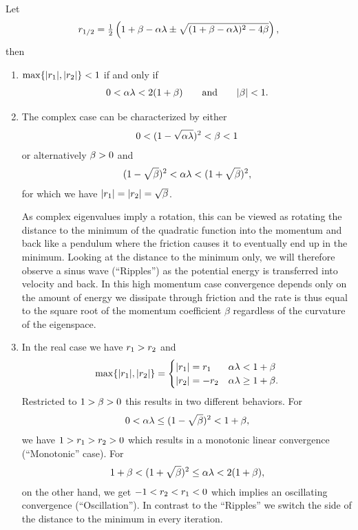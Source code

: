 \begin{theorem}
	\label{thm: momentum - stable set of parameters}
	Let
	\begin{align*}
		r_{1/2}
		= \tfrac12 \left(
			1+\beta-\alpha\lambda \pm \sqrt{(1+\beta-\alpha\lambda)^2 - 4\beta}
		\right),
	\end{align*}
	then 
	\begin{enumerate}
		\item \(\max\{|r_1|,|r_2|\}<1\) if and only if
		\begin{align*}
			0<\alpha\lambda < 2(1+\beta) \qquad \text{and} \qquad |\beta|<1.
		\end{align*}
		\item The complex case can be characterized by either
		\begin{align*}
			0<(1-\sqrt{\alpha\lambda})^2 < \beta < 1
		\end{align*}		
		or alternatively \(\beta>0\) and
		\begin{align*}
			(1-\sqrt{\beta})^2 < \alpha\lambda < (1+\sqrt{\beta})^2,
		\end{align*}
		for which we have \(|r_1|=|r_2|=\sqrt{\beta}\).
		
		As complex
		eigenvalues imply a rotation, this can be viewed as rotating the distance
		to the minimum of the quadratic function into the momentum and back like 
		a pendulum where the friction causes it to eventually end up in the
		minimum. Looking at the distance to the minimum only, we will therefore
		observe a sinus wave (``Ripples'') as the potential energy is transferred
		into velocity and back. In this high momentum case convergence depends
		only on the amount of energy we dissipate through friction and the rate is
		thus equal to the square root of the momentum coefficient \(\beta\)
		regardless of the curvature of the eigenspace.
		\item In the real case we have \(r_1>r_2\) and
		\begin{align}
			\max\{|r_1|, |r_2|\} = \begin{cases}
				|r_1|=r_1 & \alpha\lambda < 1+\beta \\
				|r_2|=-r_2 & \alpha\lambda \ge 1+\beta.
			\end{cases}
		\end{align}
		Restricted to \(1>\beta>0\) this results in two different	
		behaviors. For
		\begin{align*}
			0<\alpha\lambda \le (1-\sqrt{\beta})^2 < 1+\beta,
		\end{align*}
		we have \(1>r_1 > r_2 > 0\) which results in a monotonic
		linear convergence (``Monotonic'' case). For
		\begin{align*}
			1+\beta < (1+\sqrt{\beta})^2\le \alpha\lambda < 2(1+\beta),
		\end{align*}
		on the other hand, we get \(-1 < r_2 < r_1 < 0\) which implies 
		an oscillating convergence (``Oscillation''). In contrast to the ``Ripples''
		we switch the side of the distance to the minimum in every iteration.
	\end{enumerate}
\end{theorem}
